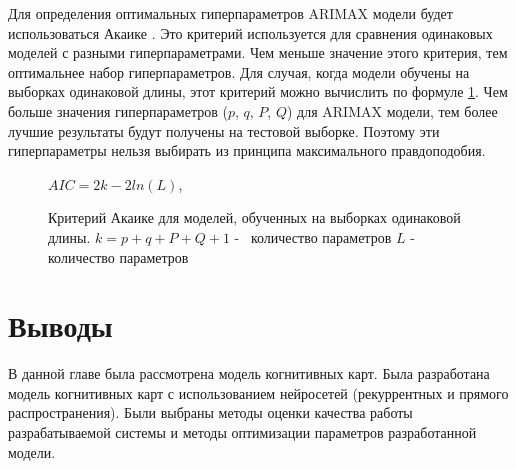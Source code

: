 Для определения оптимальных гиперпараметров ARIMAX модели будет использоваться Акаике \cite{akaike}.
Это критерий используется для сравнения одинаковых моделей с разными гиперпараметрами.
Чем меньше значение этого критерия, тем оптимальнее набор гиперпараметров.
Для случая, когда модели обучены на выборках одинаковой длины, этот критерий можно вычислить по формуле \ref{img:akaike_creiterion}.
Чем больше значения гиперпараметров ($ p $, $ q $, $ P $, $ Q $) для ARIMAX модели, тем более лучшие
результаты будут получены на тестовой выборке. Поэтому эти гиперпараметры нельзя
выбирать из принципа максимального правдоподобия.

\def\figurename{Формула}
\begin{figure}[t]
	\centering
	$ AIC = 2k - 2 ln(L) $,
	\caption{
		Критерий Акаике для моделей, обученных на выборках одинаковой длины.
		$ k = p + q + P + Q + 1 $ -~ количество параметров
		$ L $ -~ количество параметров
	}
	\label{img:akaike_creiterion}
\end{figure}
\def\figurename{Рис.}


\section{Выводы}

В данной главе была рассмотрена модель когнитивных карт.
Была разработана модель когнитивных карт
с использованием нейросетей (рекуррентных и прямого распространения).
Были выбраны методы оценки качества работы разрабатываемой системы
и методы оптимизации параметров разработанной модели.